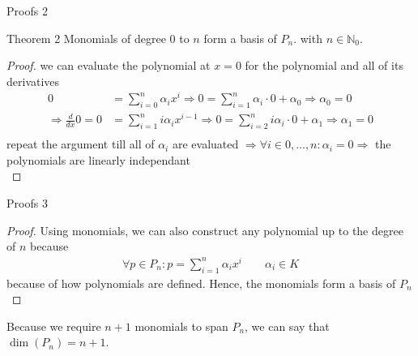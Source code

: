 \documentclass[8pt]{beamer}
\begin{document}
	\begin{frame}{Proofs 2}
		\begin{block}{Theorem 2}
			Monomials of degree $0$ to $n$ form a basis of $P_n$. with $n \in \mathbb{N}_0$.
		\end{block}
		\begin{proof}
 			we can evaluate the polynomial at $x = 0$ for the polynomial and all of its derivatives
			\begin{align*}
				0 &= \sum_{i=0}^{n}\alpha_i x^i \Rightarrow 0  =\sum_{i=1}^{n}\alpha_i \cdot 0 + \alpha_0 \Rightarrow \alpha_0 = 0\\
				\Rightarrow \frac{d}{dx} 0 = 0 &=\sum_{i=1}^{n}i\alpha_i x^{i-1} \Rightarrow 0  =\sum_{i=2}^{n}i\alpha_i \cdot 0 + \alpha_1 \Rightarrow \alpha_1 = 0\\
			\end{align*}
			repeat the argument till all of $\alpha_i$ are evaluated $\Rightarrow \forall i \in 0, \ldots, n: \alpha_i = 0\Rightarrow$ the polynomials are linearly independant\\
		\end{proof}

		\end{frame}
			
		\begin{frame}{Proofs 3}
			\begin{proof}
				Using monomials, we can also construct any polynomial up to the degree of $n$ because
				\begin{align*}
					\forall p \in P_n : p = \sum_{i=1}^{n}\alpha_i x^i \qquad \alpha_i\in K 
				\end{align*}
				because of how polynomials are defined. Hence, the monomials form a basis of $P_n$\\
			\end{proof}
			Because we require $n+1$ monomials to span $P_n$, we can say that $\dim(P_n) = n+1$.
			
		\end{frame}
							
\end{document}
